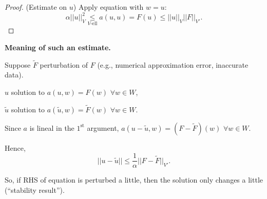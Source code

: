 \documentclass[12pt]{article}
\theoremstyle{definition}
\begin{document}
\begin{proof}
(Estimate on $u$) Apply equation with $w=u$:
\[\alpha||u||_V^2\underset{V\text{-ell}}\leq a(u,u)=F(u)\leq||u||_V||F||_{V'}.\]
\end{proof}

\textbf{Meaning of such an estimate.}

Suppose $\widetilde F$ perturbation of $F$ (e.g., numerical approximation error, inaccurate data).

$u$ solution to $a(u,w)=F(w)$ $\forall w\in W$,

$\tilde u$ solution to $a(\tilde u,w)=\widetilde F(w)$ $\forall w\in W$.

Since $a$ is lineal in the $1^\text{st}$ argument, $a(u-\tilde u,w)=(F-\widetilde F)(w)$ $\forall w\in W$.

Hence,
\[||u-\tilde u||\leq\frac1\alpha||F-\widetilde F||_{V'}.\]

So, if RHS of equation is perturbed a little, then the solution only changes a little (``stability result'').
\end{document}
